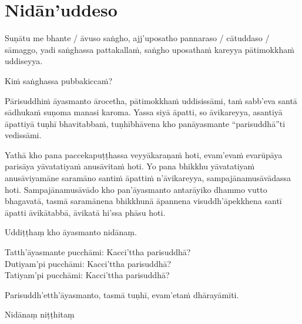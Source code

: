 \section{Nidān'uddeso}
\label{nidan'uddeso}

Suṇātu me bhante / āvuso saṅgho, ajj'uposatho pannaraso / cātuddaso / sāmaggo, yadi saṅghassa pattakallaṁ, saṅgho uposathaṁ kareyya pātimokkhaṁ uddiseyya.

Kiṁ saṅghassa pubbakiccaṁ?

Pārisuddhiṁ āyasmanto ārocetha, pātimokkhaṁ uddisissāmi, taṁ sabb'eva santā sādhukaṁ suṇoma manasi karoma. Yassa siyā āpatti, so āvikareyya, asantiyā āpattiyā tuṇhī bhavitabbaṁ, tuṇhībhāvena kho panāyasmante “parisuddhā”ti vedissāmi.

Yathā kho pana paccekapuṭṭhassa veyyākaraṇaṁ hoti, evam'evaṁ evarūpāya parisāya yāvatatiyaṁ anusāvitaṁ hoti. Yo pana bhikkhu yāvatatiyaṁ anusāviyamāne saramāno santiṁ āpattiṁ n'āvikareyya, sampajānamusāvādassa hoti. Sampajānamusāvādo kho pan'āyasmanto antarāyiko dhammo vutto bhagavatā, tasmā saramānena bhikkhunā āpannena visuddh'āpekkhena santī āpatti āvikātabbā, āvikatā hi'ssa phāsu hoti.

\medskip

\begin{center}
Uddiṭṭhaṃ kho āyasmanto nidānaṃ.

\smallskip

Tatth'āyasmante pucchāmi: Kacci'ttha parisuddhā?\\
Dutiyam'pi pucchāmi: Kacci'ttha parisuddhā?\\
Tatiyam'pi pucchāmi: Kacci'ttha parisuddhā?

\smallskip

Parisuddh'etth'āyasmanto, tasmā tuṇhī, evam'etaṁ dhārayāmīti.
\end{center}

\begin{outro}
  Nidānaṃ niṭṭhitaṃ
\end{outro}

\clearpage
